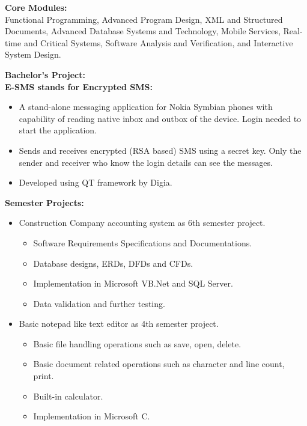 \documentclass[a4paper]{article}
\begin{document}
                \begin{description}
                    \item \textbf{Core Modules:}\\
                    Functional Programming, Advanced Program Design, XML and Structured Documents, Advanced Database Systems and Technology, Mobile Services, Real-time and Critical Systems, Software Analysis and Verification, and Interactive System Design.
                    \item \textbf{Bachelor's Project:}\\
                    \textbf{E-SMS stands for Encrypted SMS:}
                    \begin{itemize}
                        \item A stand-alone messaging application for Nokia Symbian phones with capability of reading native inbox and outbox of the device. Login needed to start the application.
                        \item Sends and receives encrypted (RSA based) SMS using a secret key. Only the sender and receiver who know the login details can see the messages.
                        \item Developed using QT framework by Digia.
                    \end{itemize}
                    \textbf{Semester Projects:}
                    \begin{itemize}
                        \item Construction Company accounting system as 6th semester project.
                        \begin{itemize}
                            \item Software Requirements Specifications and Documentations.
                            \item Database designs, ERDs, DFDs and CFDs.
                            \item Implementation in Microsoft VB.Net and SQL Server.
                            \item Data validation and further testing.
                        \end{itemize}
                        \item Basic notepad like text editor as 4th semester project.
                        \begin{itemize}
                            \item Basic file handling operations such as save, open, delete.
                            \item Basic document related operations such as character and line count, print.
                            \item Built-in calculator.
                            \item Implementation in Microsoft C.
                        \end{itemize}
                    \end{itemize}
        
                \end{description}
            
\end{document}
